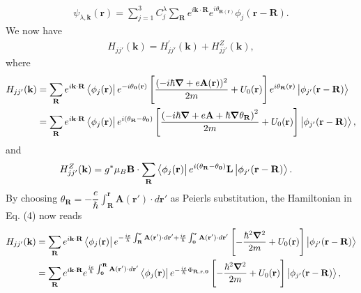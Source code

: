 \documentclass{report}
\newcommand{\f}[2]{\dfrac{#1}{#2}}
\begin{document}
\begin{align}
	\psi_{\lambda,\mathbf{k}} (\mathbf{r}) = \sum_{j=1}^{3} C_{j}^{\lambda} \sum_{\mathbf{R}} e^{i\mathbf{k \cdot R}} e^{i \theta_{\mathbf{R}(\mathbf{r})}} \phi_{j}(\mathbf{r} - \mathbf{R}).
\end{align}
We now have
\begin{align}
	H_{j j'} (\mathbf{k}) = H_{jj'}^{'}(\mathbf{k}) + H_{jj'}^{Z}(\mathbf{k}),
\end{align}
where
\begin{align}
	H_{jj'}(\mathbf{k})
	 & = \sum_{\mathbf{R}} e^{i\mathbf{k \cdot R}} \bra{\phi_{j}(\mathbf{r})} e^{-i \theta_{\mathbf{0}}(\mathbf{r})} \left[\f{(-i\hbar \boldsymbol{\nabla} + e \mathbf{A}(\mathbf{r}))^{2}}{2m} + U_{0}(\mathbf{r}) \right] e^{i \theta_{\mathbf{R}}(\mathbf{r})} \ket{\phi_{j'}(\mathbf{r - R})}\nonumber                  \\
	 & = \sum_{\mathbf{R}} e^{i\mathbf{k \cdot R}} \bra{\phi_{j}(\mathbf{r})} e^{i(\theta_{\mathbf{R}} - \theta_{\mathbf{0}} )} \left[ \f{ \left( -i\hbar \boldsymbol{\nabla} + e \mathbf{A} + \hbar \boldsymbol{\nabla} \theta_{\mathbf{R}} \right)^{2} }{2m} + U_{0}(\mathbf{r}) \right] \ket{\phi_{j'}(\mathbf{r - R})},
\end{align}
and
\begin{align}
	H_{jj'}^{Z}(\mathbf{k})
	 & = g^{*} \mu_{B} \mathbf{B} \cdot \sum_{\mathbf{R}} \bra{\phi_{j}(\mathbf{r})} e^{i(\theta_{\mathbf{R}} - \theta_{\mathbf{0}} )} \mathbf{L} \ket{\phi_{j'}(\mathbf{r - R})}.
\end{align}
By choosing $\theta_{\mathbf{R}} = - \f{e}{\hbar} \int_{\mathbf{R}}^{\mathbf{r}} \mathbf{A(\mathbf{r'})} \cdot d\mathbf{r'}$ as Peierls substitution, the Hamiltonian in Eq. (4) now reads
\begin{align}
	H_{jj'}(\mathbf{k})
	 & = \sum_{\mathbf{R}} e^{i\mathbf{k \cdot R}} \bra{\phi_{j}(\mathbf{r})} e^{ - \frac{ie}{\hbar} \int_{\mathbf{R}}^{\mathbf{r}} \mathbf{A}(\mathbf{r'}) \cdot d\mathbf{r'} + \frac{ie}{\hbar}\int_{\mathbf{0}}^{\mathbf{r}}\mathbf{A(\mathbf{r'})}\cdot d\mathbf{r'} } \left[- \f{\hbar^{2} \boldsymbol{\nabla}^{2}}{2m} + U_{0} (\mathbf{r}) \right] \ket{\phi_{j'}(\mathbf{r - R})} \nonumber \\
	 & = \sum_{\mathbf{R}} e^{i \mathbf{k \cdot R}} e^{\frac{ie}{\hbar} \int_{\mathbf{0}}^{\mathbf{R}} \mathbf{A(\mathbf{r'})} \cdot d \mathbf{r'} } \bra{\phi_{j}(\mathbf{r})} e^{-\frac{ie}{\hbar} \Phi_{\mathbf{R,r,0}}} \left[ -\f{\hbar^{2} \boldsymbol{\nabla}^{2}}{2m} + U_{0} (\mathbf{r}) \right] \ket{\phi_{j'}(\mathbf{r - R})},
\end{align}
\end{document}
